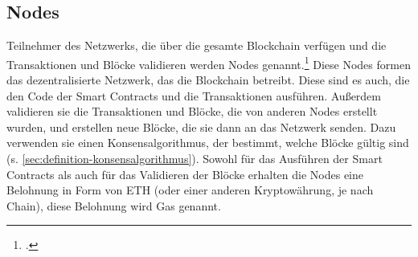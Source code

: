 \subsection{Nodes}
\label{sec:definition-nodes}
Teilnehmer des Netzwerks, die über die gesamte Blockchain verfügen und die Transaktionen und Blöcke validieren werden Nodes genannt.\footcites[Vgl. hierzu und im Folgenden][]{w12}[]{w13} 
Diese Nodes formen das dezentralisierte Netzwerk, das die Blockchain betreibt.
Diese sind es auch, die den Code der Smart Contracts und die Transaktionen ausführen.
Außerdem validieren sie die Transaktionen und Blöcke, die von anderen Nodes erstellt wurden, und erstellen neue Blöcke, die sie dann an das Netzwerk senden.
Dazu verwenden sie einen Konsensalgorithmus, der bestimmt, welche Blöcke gültig sind (s. \ref{sec:definition-konsensalgorithmus}). 
Sowohl für das Ausführen der Smart Contracts als auch für das Validieren der Blöcke erhalten die Nodes eine Belohnung in Form von ETH (oder einer anderen Kryptowährung, je nach Chain), diese Belohnung wird Gas genannt.
